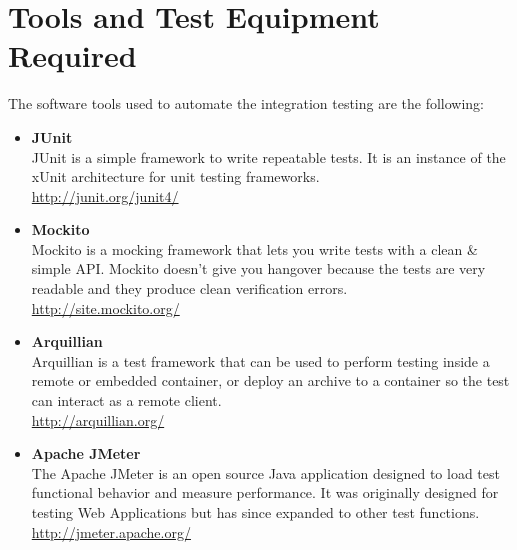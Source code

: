 \section{Tools and Test Equipment Required} \label{sec tools}

The software tools used to automate the integration testing are the following:
\begin{itemize}
	\item \textbf{JUnit} \\ JUnit is a simple framework to write repeatable tests. It is an instance of the xUnit architecture for unit testing frameworks. \\ \url{http://junit.org/junit4/} 
	\item \textbf{Mockito} \\ Mockito is a mocking framework that lets you write tests with a clean \& simple API. Mockito doesn’t give you hangover because the tests are very readable and they produce clean verification errors.  \\ \url{http://site.mockito.org/} 
	\item \textbf{Arquillian} \\ Arquillian is a test framework that can be used to perform testing inside a remote or embedded container, or deploy an archive to a container so the test can interact as a remote client. \\ \url{http://arquillian.org/} 
	\item \textbf{Apache JMeter} \\ The Apache JMeter is an open source Java application designed to load test functional behavior and measure performance. It was originally designed for testing Web Applications but has since expanded to other test functions. \\ \url{http://jmeter.apache.org/} 
\end{itemize}


